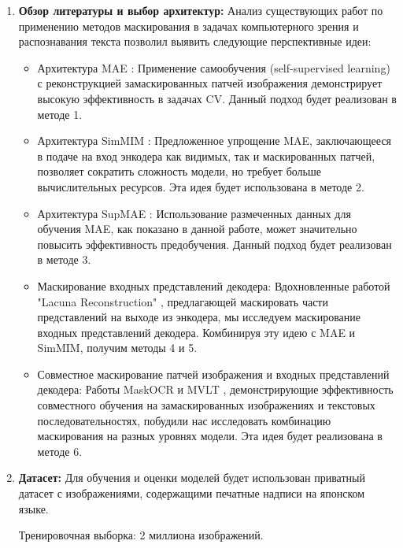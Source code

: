 \begin{enumerate}
   \item \textbf{Обзор литературы и выбор архитектур:}
   Анализ существующих работ по применению методов маскирования в задачах компьютерного зрения и распознавания текста позволил выявить следующие перспективные идеи:
   \begin{itemize}
     \item Архитектура MAE \cite{he2021masked}: Применение самообучения (self-supervised learning) с реконструкцией замаскированных патчей изображения демонстрирует высокую эффективность в задачах CV. Данный подход будет реализован в методе 1.

     \item Архитектура SimMIM \cite{xie2021simmim}: Предложенное упрощение MAE, заключающееся в подаче на вход энкодера как видимых, так и маскированных патчей, позволяет сократить сложность модели, но требует больше вычислительных ресурсов. Эта идея будет использована в методе 2.
   
     \item Архитектура SupMAE \cite{gao2022supmae}: Использование размеченных данных для обучения MAE, как показано в данной работе, может значительно повысить эффективность предобучения. Данный подход будет реализован в методе 3. 

     \item Маскирование входных представлений декодера: Вдохновленные работой "Lacuna Reconstruction" \cite{stammer2023lacuna}, предлагающей маскировать части представлений на выходе из энкодера, мы исследуем маскирование входных представлений декодера. Комбинируя эту идею с MAE и SimMIM, получим методы 4 и 5. 
     
     \item Совместное маскирование патчей изображения и входных представлений декодера: Работы MaskOCR \cite{lyons2022masked} и MVLT \cite{lyons2022masked}, демонстрирующие эффективность совместного обучения на замаскированных изображениях и текстовых последовательностях, побудили нас исследовать комбинацию маскирования на разных уровнях модели. Эта идея будет реализована в методе 6.
   \end{itemize}


   \item \textbf{Датасет:}
   Для обучения и оценки моделей будет использован приватный датасет с изображениями, содержащими печатные надписи на японском языке. 

   Тренировочная выборка: 2 миллиона изображений.


\end{enumerate}
